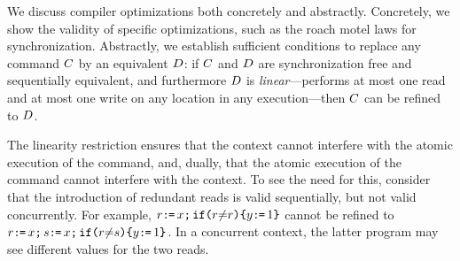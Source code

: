 We discuss compiler optimizations both concretely and abstractly.
Concretely, we show the validity of specific optimizations, such as the roach motel laws for synchronization.
Abstractly, we establish sufficient conditions to replace any command $C$ by an equivalent $D$: if
$C$ and $D$ are synchronization free and sequentially equivalent, and furthermore $D$ is \emph{linear}---performs at most one read and at most one write on any location in any execution---then $C$ can be refined to $D$.  

The linearity restriction ensures that the context cannot interfere with the atomic execution of the command, and, dually, that the atomic execution of the command cannot interfere with the context.   To see the need for this, consider that the introduction of redundant reads is valid sequentially, but not valid concurrently. For example, $r \texttt{:}\mkern-1mu\texttt{=}\, x \texttt{;}\,\allowbreak \texttt{if}\allowbreak\texttt{(}r {\neq} r\texttt{)}\allowbreak\texttt{\{} y \texttt{:}\mkern-1mu\texttt{=}\, 1 \texttt{\}}$ cannot be refined to $r \texttt{:}\mkern-1mu\texttt{=}\, x \texttt{;}\,\allowbreak s \texttt{:}\mkern-1mu\texttt{=}\, x  \texttt{;}\,\allowbreak  \texttt{if}\allowbreak\texttt{(}r {\neq} s\texttt{)} \allowbreak\texttt{\{} y \texttt{:}\mkern-1mu\texttt{=}\, 1 \texttt{\}}$.  In a concurrent context, the latter program may see different values for the two reads.






